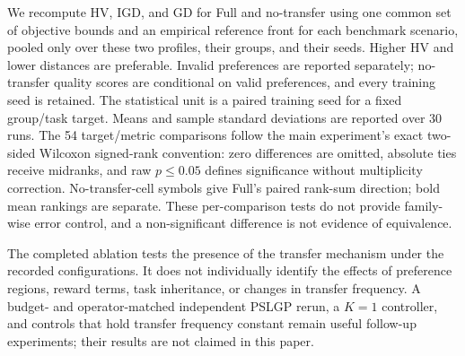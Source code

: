 We recompute HV, IGD, and GD for Full and no-transfer using one common set of objective bounds and an empirical reference front for each benchmark scenario, pooled only over these two profiles, their groups, and their seeds. Higher HV and lower distances are preferable. Invalid preferences are reported separately; no-transfer quality scores are conditional on valid preferences, and every training seed is retained. The statistical unit is a paired training seed for a fixed group/task target. Means and sample standard deviations are reported over 30 runs. The 54 target/metric comparisons follow the main experiment's exact two-sided Wilcoxon signed-rank convention: zero differences are omitted, absolute ties receive midranks, and raw $p\leq0.05$ defines significance without multiplicity correction. No-transfer-cell symbols give Full's paired rank-sum direction; bold mean rankings are separate. These per-comparison tests do not provide family-wise error control, and a non-significant difference is not evidence of equivalence.

The completed ablation tests the presence of the transfer mechanism under the recorded configurations. It does not individually identify the effects of preference regions, reward terms, task inheritance, or changes in transfer frequency. A budget- and operator-matched independent PSLGP rerun, a $K=1$ controller, and controls that hold transfer frequency constant remain useful follow-up experiments; their results are not claimed in this paper.
\endgroup